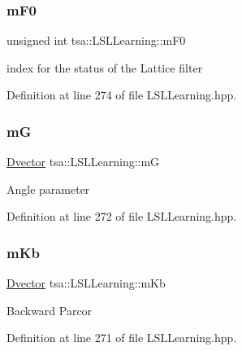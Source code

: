 \subsubsection{\texorpdfstring{m\+F0}{mF0}}
{\footnotesize\ttfamily unsigned int tsa\+::\+L\+S\+L\+Learning\+::m\+F0\hspace{0.3cm}{\ttfamily [private]}}

index for the status of the Lattice filter 

Definition at line 274 of file L\+S\+L\+Learning.\+hpp.

\mbox{\label{classtsa_1_1_l_s_l_learning_a4dc069522ea6f00876e144b7c26a8056}} 
\subsubsection{\texorpdfstring{mG}{mG}}
{\footnotesize\ttfamily \hyperlink{namespacetsa_a8900fb03d849baf447a1a0efe2561fb2}{Dvector} tsa\+::\+L\+S\+L\+Learning\+::mG\hspace{0.3cm}{\ttfamily [private]}}

Angle parameter 

Definition at line 272 of file L\+S\+L\+Learning.\+hpp.

\mbox{\label{classtsa_1_1_l_s_l_learning_ac895dcbb7407c99df7c8703e27b53ca4}} 
\subsubsection{\texorpdfstring{m\+Kb}{mKb}}
{\footnotesize\ttfamily \hyperlink{namespacetsa_a8900fb03d849baf447a1a0efe2561fb2}{Dvector} tsa\+::\+L\+S\+L\+Learning\+::m\+Kb\hspace{0.3cm}{\ttfamily [private]}}

Backward Parcor 

Definition at line 271 of file L\+S\+L\+Learning.\+hpp.

\mbox{\label{classtsa_1_1_l_s_l_learning_ad651adf83f8b9e770446ccf7f41fe61d}} 
